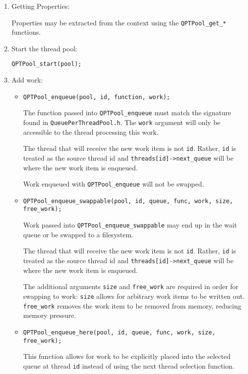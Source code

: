 \begin{enumerate}
\item Getting Properties:

  Properties may be extracted from the context using the
  \texttt{QPTPool\_get\_*} functions.

\item Start the thread pool:

  \texttt{QPTPool\_start(pool);}

\item Add work:

  \begin{itemize}
    \item \texttt{QPTPool\_enqueue(pool, id, function, work);}

    The function passed into \texttt{QPTPool\_enqueue} must match the
    signature found in \texttt{QueuePerThreadPool.h}. The
    \texttt{work} argument will only be accessible to the thread
    processing this work.

    The thread that will receive the new work item is not \texttt{id}.
    Rather, \texttt{id} is treated as the source thread id and
    \texttt{threads[id]->next\_queue} will be where the new work item
    is enqueued.

    Work enqueued with \texttt{QPTPool\_enqueue} will not be swapped.

    \item \texttt{QPTPool\_enqueue\_swappable(pool, id, queue, func, work, size, free\_work);}

    Work passed into \texttt{QPTPool\_enqueue\_swappable} may end up
    in the wait queue or be swapped to a filesystem.

    The thread that will receive the new work item is not \texttt{id}.
    Rather, \texttt{id} is treated as the source thread id and
    \texttt{threads[id]->next\_queue} will be where the new work item
    is enqueued.

    The additional arguments \texttt{size} and \texttt{free\_work} are
    required in order for swapping to work: \texttt{size} allows for
    arbitrary work items to be written out. \texttt{free\_work}
    removes the work item to be removed from memory, reducing memory
    pressure.

    \item \texttt{QPTPool\_enqueue\_here(pool, id, queue, func, work, size, free\_work);}

    This function allows for work to be explicitly placed into the
    selected queue at thread \texttt{id} instead of using the next
    thread selection function.
  \end{itemize}


\end{enumerate}
